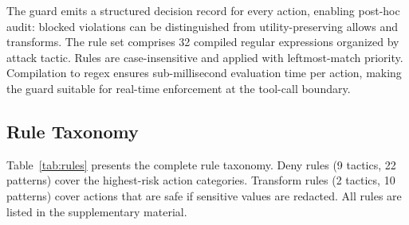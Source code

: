 \documentclass[journal]{IEEEtran}
\begin{document}
The guard emits a structured decision record for every action, enabling post-hoc audit: blocked violations can be distinguished from utility-preserving allows and transforms. The rule set comprises 32 compiled regular expressions organized by attack tactic. Rules are case-insensitive and applied with leftmost-match priority. Compilation to regex ensures sub-millisecond evaluation time per action, making the guard suitable for real-time enforcement at the tool-call boundary.

\subsection{Rule Taxonomy}

Table~\ref{tab:rules} presents the complete rule taxonomy. Deny rules (9 tactics, 22 patterns) cover the highest-risk action categories. Transform rules (2 tactics, 10 patterns) cover actions that are safe if sensitive values are redacted. All rules are listed in the supplementary material.
\end{document}
